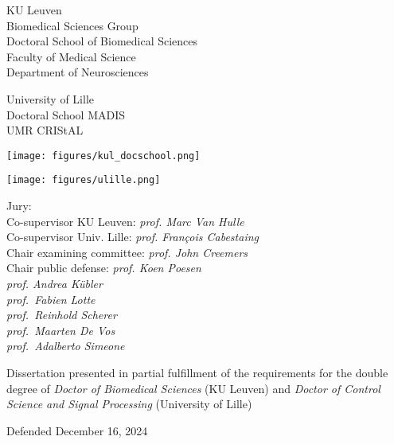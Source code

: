 {%
\parindent0pt
  \sffamily
  \begin{minipage}[t]{.5\textwidth}
  \vspace{0pt}
  KU Leuven \\
  Biomedical Sciences Group \\
  Doctoral School of Biomedical Sciences \\
  Faculty of Medical Science \\
  Department of Neurosciences
  \bigskip

  University of Lille \\
  Doctoral School MADIS \\
  UMR CRIStAL \\

  \end{minipage}\hfill%
  \begin{minipage}[t]{.3\textwidth}
    \vspace{0pt}
    \texttt{[image: figures/kul\_docschool.png]}
    \smallskip

    \texttt{[image: figures/ulille.png]}
  \end{minipage}

  \vfill


  \vfill
  \begin{minipage}[b]{.6\textwidth}
    \raggedright
    \small
    Jury: \\
    Co-supervisor KU Leuven: \emph{prof. Marc Van Hulle} \\
    Co-supervisor Univ. Lille: \emph{prof. François Cabestaing} \\
    Chair examining committee: \emph{prof. John Creemers} \\
    Chair public defense: \emph{prof. Koen Poesen} \\
    \emph{prof. Andrea K\"ubler} \\
    \emph{prof.\ Fabien Lotte} \\
    \emph{prof.\ Reinhold Scherer} \\
    \emph{prof.\ Maarten De Vos} \\
    \emph{prof.\ Adalberto Simeone}
  \end{minipage}\hfill%
  \begin{minipage}[b]{.31\textwidth}
      \raggedright
      \small
      Dissertation presented in partial fulfillment of the requirements for
      the double degree of \emph{Doctor of Biomedical Sciences} (KU Leuven)
      and \emph{Doctor of Control Science and Signal Processing} (University
      of Lille)
  \end{minipage}
  \bigskip

  \centering
  \hfill Defended December 16, 2024\hfill
}
